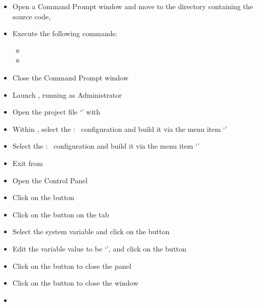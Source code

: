 \tertiaryEnd
{}
\begin{itemize}
\item Open a Command Prompt window and move to the directory containing the \mplusm{}
source code, 
\item\exSp{}Execute the following commands:
\begin{itemize}
\item{}
\item\exSp{}
\end{itemize}
\item\exSp{}Close the Command Prompt window
\item\exSp{}Launch , running as Administrator
\item\exSp{}Open the project file
`' with
\item\exSp{}Within , select the  :\ 
configuration and build it via the menu item
`'
\item\exSp{}Select the  :\  configuration and build it via
the menu item `'
\item\exSp{}Exit from 
\item\exSp{}Open the  Control Panel
\item\exSp{}Click on the  button
\item\exSp{}Click on the  button on the 
tab
\item\exSp{}Select the  system variable and click on the 
button 
\item\exSp{}Edit the variable value to be `',
and click on the  button
\item\exSp{}Click on the  button to close the 
panel
\item\exSp{}Click on the  button to close the 
window
\end{itemize}
\tertiaryEnd
{}
\begin{itemize}
\item\TBD
\end{itemize}
